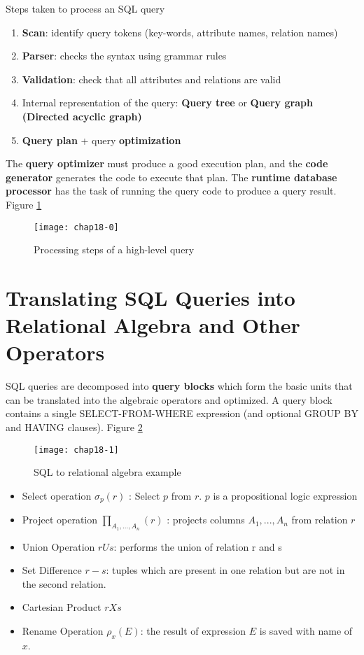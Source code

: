 
Steps taken to process an SQL query
\begin{enumerate}
    \item \textbf{Scan}: identify query tokens (key-words, attribute names, relation names)
    \item \textbf{Parser}: checks the syntax using grammar rules
    \item \textbf{Validation}: check that all attributes and relations are valid
    \item Internal representation of the query: \textbf{Query tree} or \textbf{Query graph (Directed acyclic graph)}
    \item \textbf{Query plan} + query \textbf{optimization}
\end{enumerate}

The \textbf{query optimizer} must produce a good execution plan, and the \textbf{code generator} generates the code to execute that plan. The \textbf{runtime database processor} has the task of running the query code to produce a query result. Figure \ref{fig:chap18-0}

\begin{figure}
    \centering
    \texttt{[image: chap18-0]}
    \caption{Processing steps of a high-level query}
    \label{fig:chap18-0}
\end{figure}

\section{Translating SQL Queries into Relational
Algebra and Other Operators}

SQL queries are decomposed into \textbf{query blocks} which form the basic units that can be translated into the algebraic operators and optimized. A query block contains a single SELECT-FROM-WHERE expression (and optional GROUP BY and HAVING clauses). Figure \ref{fig:chap18-SQL-Rel}

\begin{figure}
    \centering
    \texttt{[image: chap18-1]}
    \caption{SQL to relational algebra example}
    \label{fig:chap18-SQL-Rel}
\end{figure}

\begin{itemize}
    \item Select operation $\sigma_p(r)$ : Select $p$ from $r$. $p$ is a propositional logic expression
    \item Project operation $\prod_{A_1,...,A_n}(r)$ : projects columns $A_1,...,A_n$ from relation $r$
    \item Union Operation $r U s$: performs the union of relation r and s
    \item Set Difference $r - s$: tuples which are present in one relation but are not in the second relation.
    \item Cartesian Product $r X s$
    \item Rename Operation $\rho_x(E)$: the result of expression $E$ is saved with name of $x$.
\end{itemize}

